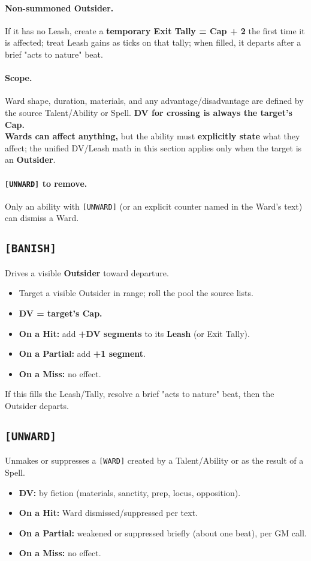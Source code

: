 \documentclass[11pt]{article}
\begin{document}
\paragraph{Non-summoned Outsider.}
If it has no Leash, create a \textbf{temporary Exit Tally = Cap + 2} the first time it is affected; treat Leash gains as ticks on that tally; when filled, it departs after a brief "acts to nature" beat.

\paragraph{Scope.}
Ward shape, duration, materials, and any advantage/disadvantage are defined by the source Talent/Ability or Spell. \textbf{DV for crossing is always the target's Cap.} \\
\textbf{Wards can affect anything,} but the ability must \textbf{explicitly state} what they affect; the unified DV/Leash math in this section applies only when the target is an \textbf{Outsider}.

\paragraph{\texttt{[UNWARD]} to remove.}
Only an ability with \texttt{[UNWARD]} (or an explicit counter named in the Ward's text) can dismiss a Ward.

\subsection*{\texttt{[BANISH]}}
Drives a visible \textbf{Outsider} toward departure.
\begin{itemize}
  \item Target a visible Outsider in range; roll the pool the source lists.
  \item \textbf{DV = target's Cap.}
  \item \textbf{On a Hit:} add \textbf{+DV segments} to its \textbf{Leash} (or Exit Tally).
  \item \textbf{On a Partial:} add \textbf{+1 segment}.
  \item \textbf{On a Miss:} no effect.
\end{itemize}
If this fills the Leash/Tally, resolve a brief "acts to nature" beat, then the Outsider departs.

\subsection*{\texttt{[UNWARD]}}
Unmakes or suppresses a \texttt{[WARD]} created by a Talent/Ability or as the result of a Spell.
\begin{itemize}
  \item \textbf{DV:} by fiction (materials, sanctity, prep, locus, opposition).
  \item \textbf{On a Hit:} Ward dismissed/suppressed per text.
  \item \textbf{On a Partial:} weakened or suppressed briefly (about one beat), per GM call.
  \item \textbf{On a Miss:} no effect.
\end{itemize}
\end{document}
